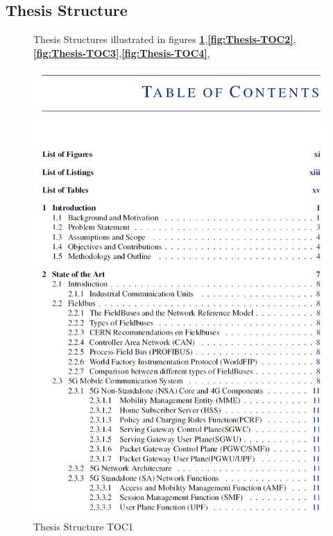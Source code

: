 

\subsection{\textbf{Thesis Structure}}\label{Structure of the Thesis} 



 
\begin{figure}
Thesis Structures illustrated in figures \textbf{\ref{fig:Thesis-TOC1}},\textbf{\ref{fig:Thesis-TOC2}},\textbf{\ref{fig:Thesis-TOC3}},\textbf{\ref{fig:Thesis-TOC4}},


 \end{figure}
\begin{figure}
 
\centering
\includegraphics[scale=0.41]{images/Thesis-TOC1.png} 
\caption{Thesis Structure TOC1}
\label{fig:Thesis-TOC1}
 

 \end{figure}
